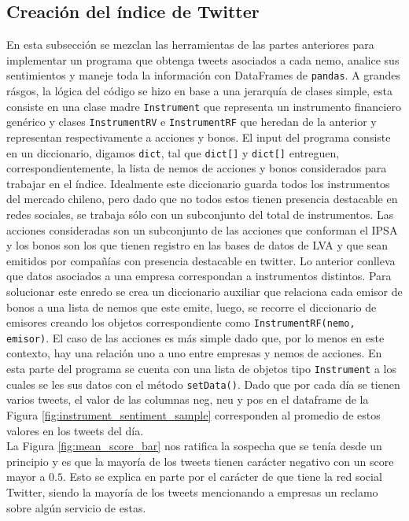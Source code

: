 \documentclass{article}
\begin{document}
\subsection{Creación del índice de Twitter}
En esta subsección se mezclan las herramientas de las partes anteriores para implementar un programa que obtenga tweets asociados a cada nemo, analice sus sentimientos y maneje toda la información con DataFrames de \texttt{pandas}. A grandes rásgos, la lógica del código se hizo en base a una jerarquía de clases simple, esta consiste en una clase madre \texttt{Instrument} que representa un instrumento financiero genérico y clases \texttt{InstrumentRV} e \texttt{InstrumentRF} que heredan de la anterior y representan respectivamente a acciones y bonos.
El input del programa consiste en un diccionario, digamos \texttt{dict}, tal que \texttt{dict[]} y \texttt{dict[]} entreguen, correspondientemente, la lista de nemos de acciones y bonos considerados para trabajar en el índice. Idealmente este diccionario guarda todos los instrumentos del mercado chileno, pero dado que no todos estos tienen presencia destacable en redes sociales, se trabaja sólo con un subconjunto del total de instrumentos. Las acciones consideradas son un subconjunto de las acciones que conforman el IPSA y los bonos son los que tienen registro en las bases de datos de LVA y que sean emitidos por compañías con presencia destacable en twitter. Lo anterior conlleva que datos asociados a una empresa correspondan a instrumentos distintos. Para solucionar este enredo se crea un diccionario auxiliar que relaciona cada emisor de bonos a una lista de nemos que este emite, luego, se recorre el diccionario de emisores creando los objetos correspondiente como \texttt{InstrumentRF(nemo, emisor)}. El caso de las acciones es más simple dado que, por lo menos en este contexto, hay una relación uno a uno entre empresas y nemos de acciones. En esta parte del programa se cuenta con una lista de objetos tipo \texttt{Instrument} a los cuales se les  sus datos con el método \texttt{setData()}. Dado que por cada día se tienen varios tweets, el valor de las columnas neg, neu y pos en el dataframe de la Figura \ref{fig:instrument_sentiment_sample} corresponden al promedio de estos valores en los tweets del día.\\
La Figura \ref{fig:mean_score_bar} nos ratifica la sospecha que se tenía desde un principio y es que la mayoría de los tweets tienen carácter negativo con un score mayor a $0.5$. Esto se explica en parte por el carácter de  que tiene la red social Twitter, siendo la mayoría de los tweets mencionando a empresas un reclamo sobre algún servicio de estas.\\
\end{document}
